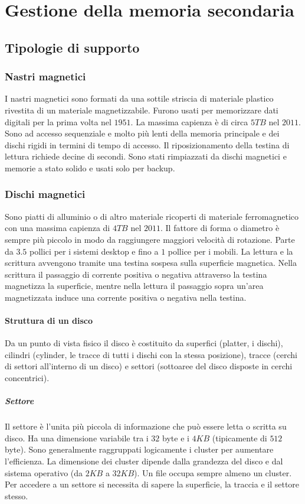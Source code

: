 \chapter{Gestione della memoria secondaria}
\section{Tipologie di supporto}
\subsection{Nastri magnetici}
I nastri magnetici sono formati da una sottile striscia di materiale plastico rivestita di un materiale magnetizzabile. Furono usati per memorizzare dati digitali per la prima volta
nel $1951$. La massima capienza \`e di circa $5TB$ nel $2011$. Sono ad accesso sequenziale e molto pi\`u lenti della memoria principale e dei dischi rigidi in termini di tempo di 
accesso. Il riposizionamento della testina di lettura richiede decine di secondi. Sono stati rimpiazzati da dischi magnetici e memorie a stato solido e usati solo per backup. 
\subsection{Dischi magnetici}
Sono piatti di alluminio o di altro materiale ricoperti di materiale ferromagnetico con una massima capienza di $4TB$ nel $2011$. Il fattore di forma o diametro \`e sempre pi\`u piccolo
in modo da raggiungere maggiori velocit\`a di rotazione. Parte da $3.5$ pollici per i sistemi desktop e fino a $1$ pollice per i mobili. La lettura e la scrittura avvengono tramite una
testina sospesa sulla superficie magnetica. Nella scrittura il passaggio di corrente positiva o negativa attraverso la testina magnetizza la superficie, mentre nella lettura il 
passaggio sopra un'area magnetizzata induce una corrente positiva o negativa nella testina. 
\subsubsection{Struttura di un disco}
Da un punto di vista fisico il disco \`e costituito da superfici (platter, i dischi), cilindri (cylinder, le tracce di tutti i dischi con la stessa posizione), tracce (cerchi di settori
all'interno di un disco) e settori (sottoaree del disco disposte in cerchi concentrici). 
\paragraph{Settore}
Il settore \`e l'unita pi\`u piccola di informazione che pu\`o essere letta o scritta su disco. Ha una dimensione variabile tra i $32$ byte e i $4KB$ (tipicamente di $512$ byte). Sono 
generalmente raggruppati logicamente i cluster per aumentare l'efficienza. La dimensione dei cluster dipende dalla grandezza del disco e dal sistema operativo (da $2KB$ a $32KB$). Un
file occupa sempre almeno un cluster. Per accedere a un settore si necessita di sapere la superficie, la traccia e il settore stesso. 
